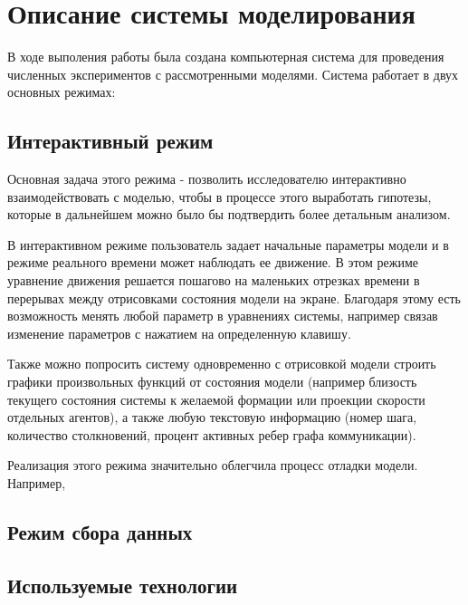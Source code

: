 \chapter{Описание системы моделирования} \label{simulation}

В ходе выполения работы была создана компьютерная система для проведения численных экспериментов с рассмотренными моделями. 
Система работает в двух основных режимах:

\section{Интерактивный режим}
Основная задача этого режима - позволить исследователю интерактивно взаимодействовать с моделью, чтобы в процессе этого выработать гипотезы, которые в дальнейшем можно было бы подтвердить более детальным анализом.

В интерактивном режиме пользователь задает начальные параметры модели и в режиме реального времени может наблюдать  ее движение. В этом режиме уравнение движения решается пошагово на маленьких отрезках времени в перерывах между отрисовками состояния модели на экране. 
Благодаря этому есть возможность менять любой параметр в уравнениях системы, например связав изменение параметров с нажатием на определенную клавишу. 

Также можно попросить систему одновременно с отрисовкой модели строить графики произвольных функций от состояния модели (например близость текущего состояния системы к желаемой формации или проекции скорости отдельных агентов), а также любую текстовую информацию (номер шага, количество столкновений, процент активных ребер графа коммуникации).

Реализация этого режима значительно облегчила процесс отладки модели. Например, 

\section{Режим сбора данных}

\section{Используемые технологии}



\clearpage
